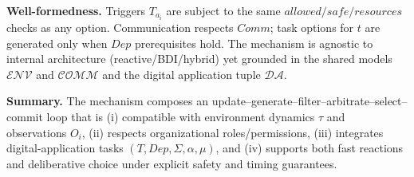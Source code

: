 \noindent\textbf{Well-formedness.} Triggers $T_{a_i}$ are subject to the same $allowed/safe/resources$ checks as any option. Communication respects $Comm$; task options for $t$ are generated only when $Dep$ prerequisites hold. The mechanism is agnostic to internal architecture (reactive/BDI/hybrid) yet grounded in the shared models $\mathcal{ENV}$ and $\mathcal{COMM}$ and the digital application tuple $\mathcal{DA}$.

\noindent\textbf{Summary.} The mechanism composes an update–generate–filter–arbitrate–select–commit loop that is (i) compatible with environment dynamics $\tau$ and observations $O_i$, (ii) respects organizational roles/permissions, (iii) integrates digital-application tasks $(T, Dep, \Sigma, \alpha, \mu)$, and (iv) supports both fast reactions and deliberative choice under explicit safety and timing guarantees.












